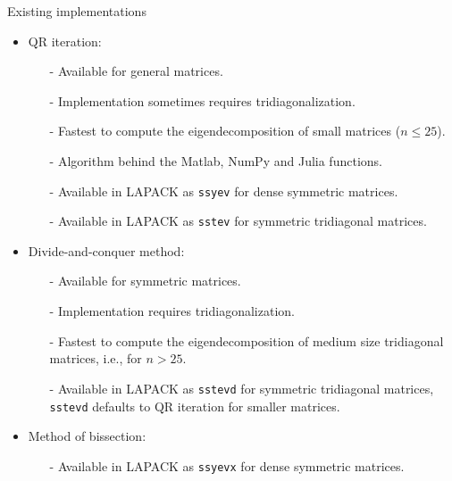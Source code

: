 \documentclass[t,usepdftitle=false]{beamer}
\begin{document}
\begin{frame}{Existing implementations}
\begin{itemize}
\item QR iteration:
\begin{itemize}\normalsize
\item[-] Available for general matrices.\vspace{.07cm}
\item[-] Implementation sometimes requires tridiagonalization.\vspace{.07cm}
\item[-] Fastest to compute the eigendecomposition of small matrices ($n\leq 25$).\vspace{.07cm}
\item[-] Algorithm behind the Matlab, NumPy and Julia functions.\vspace{.07cm}
\item[-] Available in LAPACK as \texttt{ssyev} for dense symmetric matrices.\vspace{.07cm}
\item[-] Available in LAPACK as \texttt{sstev} for symmetric tridiagonal matrices.
\end{itemize}
\item Divide-and-conquer method:
\begin{itemize}\normalsize
\item[-] Available for symmetric matrices.\vspace{.07cm}
\item[-] Implementation requires tridiagonalization.\vspace{.07cm}
\item[-] Fastest to compute the eigendecomposition of medium size tridiagonal matrices, i.e., for $n> 25$.\vspace{.07cm}
\item[-] Available in LAPACK as \texttt{sstevd} for symmetric tridiagonal matrices,\\ \texttt{sstevd} defaults to QR iteration for smaller matrices.
\end{itemize}
\item Method of bissection:
\begin{itemize}\normalsize
\item[-] Available in LAPACK as \texttt{ssyevx} for dense symmetric matrices.
\end{itemize}
\end{itemize}
\end{frame}
\end{document}
